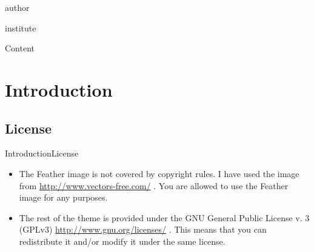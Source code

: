\documentclass[aspectratio=169,10pt,xcolor={dvipsnames}]{beamer}
\newcommand{\chref}[2]{
  \href{#1}{{\usebeamercolor[bg]{Feather}#2}}
}
\begin{document}
{\begin{frame}
\begin{textblock*}{\textwidth}
            \begin{beamercolorbox}[sep=8pt, left,colsep=-4bp,rounded=true,shadow=true]{author}
               \insertauthor
            \end{beamercolorbox}

    	    \begin{beamercolorbox}[sep=8pt,center,colsep=-4bp,rounded=true,shadow=true]{institute}
               \insertinstitute
            \end{beamercolorbox}

        \end{textblock*}
    \end{frame}}




\begin{frame}{Content}{}
\tableofcontents
\end{frame}

\section{Introduction}
\subsection{License}
\begin{frame}{Introduction}{License}

  \begin{itemize}
    \item<1-> The Feather image is not covered by copyright rules. I have used the image from \chref{http://www.vectors-free.com/}{http://www.vectors-free.com/}. You are allowed to use the Feather image for any purposes.
    \item<2-> The rest of the theme is provided under the GNU General Public License v. 3 (GPLv3) \chref{http://www.gnu.org/licenses/}{http://www.gnu.org/licenses/}. This means that you can redistribute it and/or modify it under the same license. 
  \end{itemize}
\end{frame}
\end{document}
